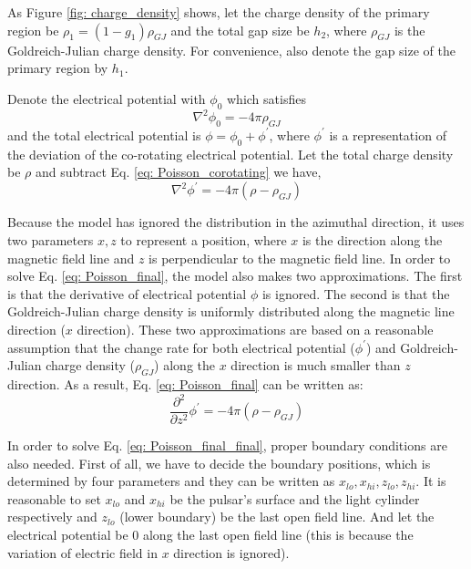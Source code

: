 \documentclass[12pt]{report}
\newcommand{\gj}[0]{
  Goldreich-Julian charge density
}
\newcommand{\myComment}[1]{
  \newline
}
\begin{document}
        As Figure \ref{fig: charge_density} shows, 
        let the charge density of the primary region be $\rho_1 = (1-g_{1}) \rho_{GJ}$ and 
        the total gap size be
        $h_{2}$, where $\rho_{GJ}$ is the Goldreich-Julian charge density. For convenience, 
        also denote the gap size of the primary region by $h_{1}$. 
        \myComment{Then we can calculate electric potential and electric field by solving the 
        Poisson equation }

        Denote the electrical potential with $\phi_{0}$ which satisfies 
        \begin{equation}
          \label{eq: Poisson_corotating}
          \nabla^{2}\phi_{0} = -4\pi\rho_{GJ}
        \end{equation}
        and the total electrical potential is $\phi = \phi_{0} + \phi^{\prime}$, 
        where $\phi^{\prime}$ is a representation of the deviation of the co-rotating 
        electrical potential. Let the total charge density be $\rho$ and subtract 
        Eq. \ref{eq: Poisson_corotating} we have,
        \begin{equation}
          \label{eq: Poisson_final}
          \nabla^{2}\phi^{\prime} = -4\pi\left(\rho - \rho_{GJ} \right)
        \end{equation}

      Because the model has ignored the distribution in the azimuthal direction, it uses two 
      parameters $x, z$ to represent a position, where $x$ is the direction along the magnetic 
      field line and $z$ is perpendicular to the magnetic field line. In order to solve 
      Eq. \ref{eq: Poisson_final}, the model also makes two approximations. The first is that 
      the derivative of electrical potential $\phi$ is ignored. The second is that the \gj{} 
      is uniformly distributed along the magnetic line direction ($x$ direction). These two 
      approximations are based on a reasonable assumption that the change rate 
      for both electrical potential ($\phi^{\prime}$) and \gj{}($\rho_{GJ}$) along the $x$ 
      direction is much smaller than $z$ direction. 
      As a result, Eq. \ref{eq: Poisson_final} can be written as: 
      \begin{equation}
        \label{eq: Poisson_final_final}
        \frac{\partial^2}{\partial z^2} \phi^{\prime} = -4\pi\left(\rho - \rho_{GJ} \right)
      \end{equation}

      In order to solve Eq. \ref{eq: Poisson_final_final}, proper boundary conditions are also 
      needed. First of all, we have to decide the boundary positions, which is determined by 
      four parameters and they can be written as $x_{lo}, x_{hi}, z_{lo}, z_{hi}$. It is 
      reasonable to set $x_{lo}$ and $x_{hi}$ be the pulsar's surface and the light cylinder 
      respectively and $z_{lo}$ (lower boundary) be the last open field line. And let the 
      electrical potential be $0$ along the last open field line (this is because the 
      variation of electric field in $x$ direction is ignored).   
\end{document}
